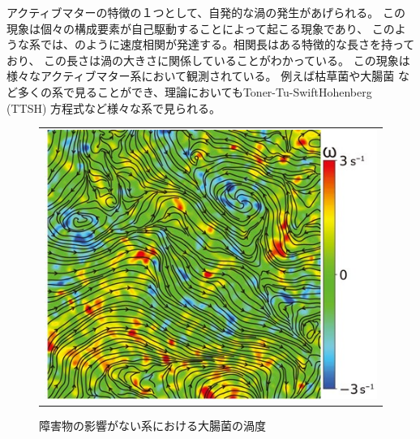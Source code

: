 \documentclass[/Users/ikedahajime/GitHub/reserch/master_report/thesis]{subfiles}
\begin{document}
アクティブマターの特徴の１つとして、自発的な渦の発生があげられる。
この現象は個々の構成要素が自己駆動することによって起こる現象であり、
このような系では、のように速度相関が発達する。相関長はある特徴的な長さを持っており、
この長さは渦の大きさに関係していることがわかっている。
この現象は様々なアクティブマター系において観測されている。
例えば枯草菌\cite{wensinkMesoscaleTurbulenceLiving2012}や大腸菌\cite{pengImagingEmergenceBacterial2021}
など多くの系で見ることができ、理論においてもToner-Tu-SwiftHohenberg (TTSH) 方程式など\cite{wensinkMesoscaleTurbulenceLiving2012}様々な系で見られる。%
\begin{figure}%
    \centering
    \begin{tabular}{c}
        \begin{minipage}{0.6\hsize}
            \includegraphics[width=\textwidth]{img/intro/abd1240-f1.jpeg}
        \end{minipage}

    \end{tabular}
    \caption[Four sample images]
    {
        障害物の影響がない系における大腸菌の渦度\cite{pengImagingEmergenceBacterial2021}
    }
    \label{fig:intro_flow}
\end{figure}%
\end{document}
